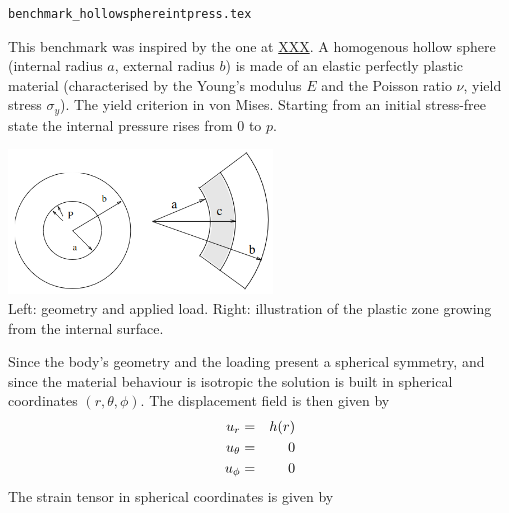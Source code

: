 \begin{flushright} {\tiny {\color{gray} \tt benchmark\_hollowsphereintpress.tex}} \end{flushright}

This benchmark was inspired by the one at \url{XXX}. 
A homogenous hollow sphere (internal radius $a$, external radius $b$) is made of an elastic 
perfectly plastic material (characterised by the Young's modulus $E$ and the Poisson ratio $\nu$, 
yield stress $\sigma_y$). The yield criterion in von Mises. 
Starting from an initial stress-free state the internal pressure rises from $0$ to $p$.

\begin{center}
\includegraphics[width=7cm]{images/benchmark_hollowsphereintpress/sphere}\\
{\captionfont Left: geometry and applied load. Right: illustration of the plastic zone
growing from the internal surface.}
\end{center}

Since the body's geometry and the loading present a spherical symmetry, and since the material
behaviour is isotropic the solution is built in spherical coordinates $(r,\theta,\phi)$.
The displacement field is then given by
\begin{eqnarray}
u_r &=& h(r) \nonumber\\
u_\theta &=& 0 \nonumber\\
u_\phi &=& 0  \nonumber
\end{eqnarray}
The strain tensor in spherical coordinates is given by

